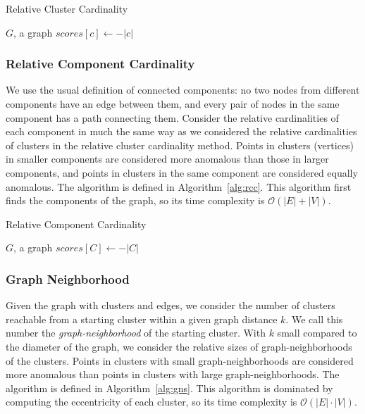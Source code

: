 \begin{algorithm}[h]
    \caption{Relative Cluster Cardinality}
    \label{alg:rclc}
\begin{algorithmic}[1]
    \REQUIRE $G$, a graph
    \STATE $scores[c] \gets -|c|$
    \ENDFOR
\end{algorithmic}
\end{algorithm}

\subsubsection{Relative Component Cardinality}
We use the usual definition of connected components:
no two nodes from different components have an edge between them, and
every pair of nodes in the same component has a path connecting them.
Consider the relative cardinalities of each component in much the same way as we considered the relative cardinalities of clusters in the relative cluster cardinality method.
Points in clusters (vertices) in smaller components are considered more anomalous than those in larger components,
and points in clusters in the same component are considered equally anomalous.
The algorithm is defined in Algorithm~\ref{alg:rcc}.
This algorithm first finds the components of the graph, so its time complexity is $\mathcal{O}(|E| + |V|)$.

\begin{algorithm}[h]
    \caption{Relative Component Cardinality}
    \label{alg:rcc}
\begin{algorithmic}[1]
    \REQUIRE $G$, a graph
        \STATE $scores[C] \gets -|C|$
    \ENDFOR
\end{algorithmic}
\end{algorithm}

\subsubsection{Graph Neighborhood}
Given the graph with clusters and edges, we consider the number of clusters reachable from a starting cluster within a given graph distance $k$.
We call this number the \textit{graph-neighborhood} of the starting cluster.
With $k$ small compared to the diameter of the graph, we consider the relative sizes of graph-neighborhoods of the clusters.
Points in clusters with small graph-neighborhoods are considered more anomalous than points in clusters with large graph-neighborhoods.
The algorithm is defined in Algorithm~\ref{alg:gns}.
This algorithm is dominated by computing the eccentricity of each cluster, so its time complexity is $\mathcal{O}(|E| \cdot |V|)$.

